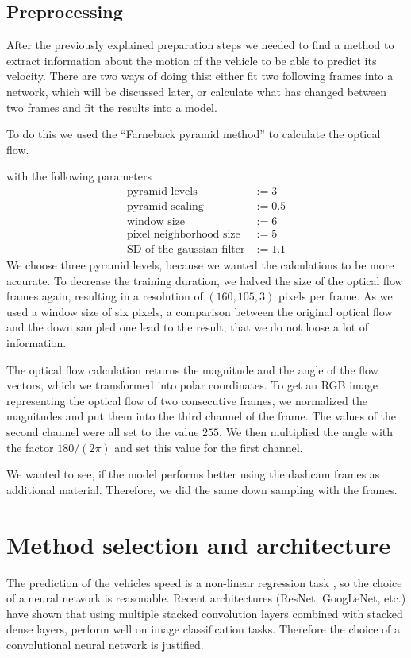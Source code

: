 \documentclass[conference]{IEEEtran}
\begin{document}
\subsection{Preprocessing}

After the previously explained preparation steps we needed to find a method to extract information about the motion of the vehicle to be able to predict its velocity. There are two ways of doing this: either fit two following frames into a network, which will be discussed later, or calculate what has changed between two frames and fit the results into a model.

To do this we used the \enquote{Farneback pyramid method} \cite{Farneback2003} to calculate the optical flow.


with  the following parameters
\begin{align*}
\text{pyramid levels} &:= 3\\
\text{pyramid scaling} &:= 0.5\\
\text{window size} &:= 6\\
\text{pixel neighborhood size} &:= 5\\
\text{SD of the gaussian filter} &:= 1.1
\end{align*}
We choose three pyramid levels, because we wanted the calculations to be more accurate. To decrease the training duration, we halved the size of the optical flow frames again, resulting in a resolution of
$(160,105,3)$ pixels per frame. As we used a window size of six pixels, a comparison between the original optical flow and the down 
sampled one lead to the result, that we do not loose a lot of information.

The optical flow calculation returns the magnitude and
the angle of the flow vectors, which we transformed into polar coordinates. To get an RGB image representing the
optical flow of two consecutive frames, we normalized the magnitudes and put them into the third channel of the frame. The values
of the second channel were all set to the value $255$. We then multiplied the angle with the factor $180/(2\pi)$ and set this value 
for the first channel.

We wanted to see, if the model performs better using the dashcam frames as additional material. Therefore, we did the same down 
sampling with the frames.

\section{Method selection and architecture}
The prediction of the vehicles speed is a non-linear regression task , so the choice of a neural network is reasonable. Recent architectures (ResNet, GoogLeNet, etc.) have shown that using multiple stacked convolution layers combined with stacked dense layers, perform well on image classification tasks. Therefore the choice of a convolutional neural 
network is justified.
\end{document}
